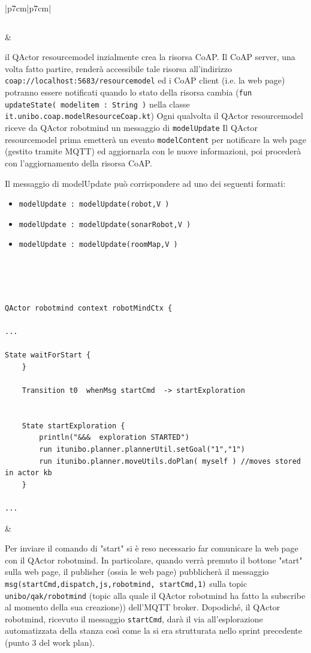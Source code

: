 \begin{center}
\begin{longtable}{|p{7cm}|p{7cm}|}
\begin{lstlisting}[backgroundcolor=\color{white} ]
\end{lstlisting}
& 

il QActor resourcemodel inzialmente crea la risorsa CoAP. Il CoAP server, una volta fatto partire, renderà accessibile tale risorsa all'indirizzo   \texttt{coap://localhost:5683/resourcemodel} ed i CoAP client (i.e. la web page) potranno essere notificati quando lo stato della risorsa cambia (\texttt{fun updateState( modelitem : String )} nella classe \texttt{it.unibo.coap.modelResourceCoap.kt})
Ogni qualvolta il QActor resourcemodel riceve da QActor robotmind un messaggio di \texttt{modelUpdate} Il QActor resourcemodel prima emetterà un evento \texttt{modelContent} per notificare la web page (gestito tramite MQTT) ed aggiornarla con le nuove informazioni,  poi procederà con l'aggiornamento della risorsa CoAP. 

Il messaggio di modelUpdate può corrispondere ad uno dei seguenti formati:
\begin{itemize}
    \item  \texttt{modelUpdate : modelUpdate(robot,V )}
    \item  \texttt{modelUpdate : modelUpdate(sonarRobot,V )} 
    \item  \texttt{modelUpdate : modelUpdate(roomMap,V )}
\end{itemize}

\\ \hline

\begin{lstlisting}[backgroundcolor=\color{white} ]


QActor robotmind context robotMindCtx { 

...

State waitForStart {
	}
	
	Transition t0  whenMsg startCmd  -> startExploration 
				 

	State startExploration {
		println("&&&  exploration STARTED")
		run itunibo.planner.plannerUtil.setGoal("1","1")
		run itunibo.planner.moveUtils.doPlan( myself ) //moves stored in actor kb
	}
	
...

\end{lstlisting}
&

Per inviare il comando di "start" si è reso necessario far comunicare la web page con il QActor robotmind. In particolare, quando verrà premuto il bottone "start" sulla web page, il publisher (ossia le web page) pubblicherà il messaggio \texttt{msg(startCmd,dispatch,js,robotmind,
startCmd,1)} sulla topic \texttt{unibo/qak/robotmind} (topic alla quale il QActor robotmind ha fatto la subscribe al momento della sua creazione)) dell'MQTT broker. Dopodiché, il QActor robotmind, ricevuto il messaggio \texttt{startCmd}, darà il via all'esplorazione automatizzata della stanza così come la si era strutturata nello sprint precedente (punto 3 del work plan).




\end{longtable}
\end{center}
